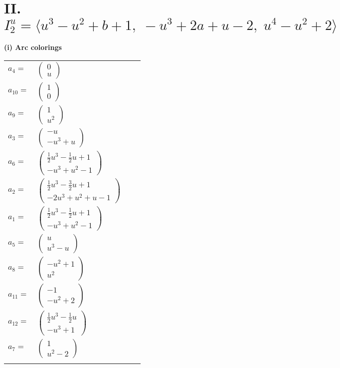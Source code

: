 \documentclass[1p]{elsarticle_modified}
\theoremstyle{definition}
\begin{document}
\centering \section*{II. $I^u_{2}= \langle u^3- u^2+b+1,\;- u^3+2 a+u-2,\;u^4- u^2+2 \rangle$}
\flushleft \textbf{(i) Arc colorings}\\
\begin{tabular}{m{7pt} m{180pt} m{7pt} m{180pt} }
\flushright $a_{4}=$&$\begin{pmatrix}0\\u\end{pmatrix}$ \\
\flushright $a_{10}=$&$\begin{pmatrix}1\\0\end{pmatrix}$ \\
\flushright $a_{9}=$&$\begin{pmatrix}1\\u^2\end{pmatrix}$ \\
\flushright $a_{3}=$&$\begin{pmatrix}- u\\- u^3+u\end{pmatrix}$ \\
\flushright $a_{6}=$&$\begin{pmatrix}\frac{1}{2} u^3-\frac{1}{2} u+1\\- u^3+u^2-1\end{pmatrix}$ \\
\flushright $a_{2}=$&$\begin{pmatrix}\frac{1}{2} u^3-\frac{3}{2} u+1\\-2 u^3+u^2+u-1\end{pmatrix}$ \\
\flushright $a_{1}=$&$\begin{pmatrix}\frac{1}{2} u^3-\frac{1}{2} u+1\\- u^3+u^2-1\end{pmatrix}$ \\
\flushright $a_{5}=$&$\begin{pmatrix}u\\u^3- u\end{pmatrix}$ \\
\flushright $a_{8}=$&$\begin{pmatrix}- u^2+1\\u^2\end{pmatrix}$ \\
\flushright $a_{11}=$&$\begin{pmatrix}-1\\- u^2+2\end{pmatrix}$ \\
\flushright $a_{12}=$&$\begin{pmatrix}\frac{1}{2} u^3-\frac{1}{2} u\\- u^3+1\end{pmatrix}$ \\
\flushright $a_{7}=$&$\begin{pmatrix}1\\u^2-2\end{pmatrix}$\\&\end{tabular}
\end{document}
